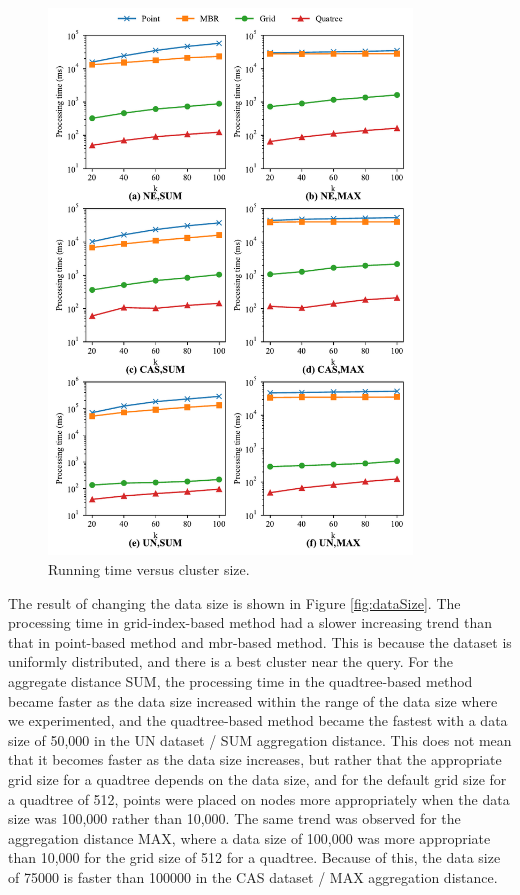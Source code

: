 \documentclass[a4paper,11pt]{report}
\theoremstyle{mytheoremstyle}
\begin{document}
\begin{figure}
    \begin{center}
        \includegraphics[width=0.86\textwidth]{matplotlib/export/clustersize.pdf}
    \end{center}
    \caption{Running time versus cluster size.}
    \label{fig:clusterSize}
\end{figure}

The result of changing the data size is shown in Figure \ref{fig:dataSize}. The processing time in grid-index-based method had a slower increasing trend than that in point-based method and mbr-based method. This is because the dataset is uniformly distributed, and there is a best cluster near the query.
For the aggregate distance SUM, the processing time in the quadtree-based method became faster as the data size increased within the range of the data size where we experimented, and the quadtree-based method became the fastest with a data size of 50,000 in the UN dataset / SUM aggregation distance. This does not mean that it becomes faster as the data size increases, but rather that the appropriate grid size for a quadtree depends on the data size, and for the default grid size for a quadtree of 512, points were placed on nodes more appropriately when the data size was 100,000 rather than 10,000. The same trend was observed for the aggregation distance MAX, where a data size of 100,000 was more appropriate than 10,000 for the grid size of 512 for a quadtree.
Because of this, the data size of 75000 is faster than 100000 in the CAS dataset / MAX aggregation distance.
\end{document}
